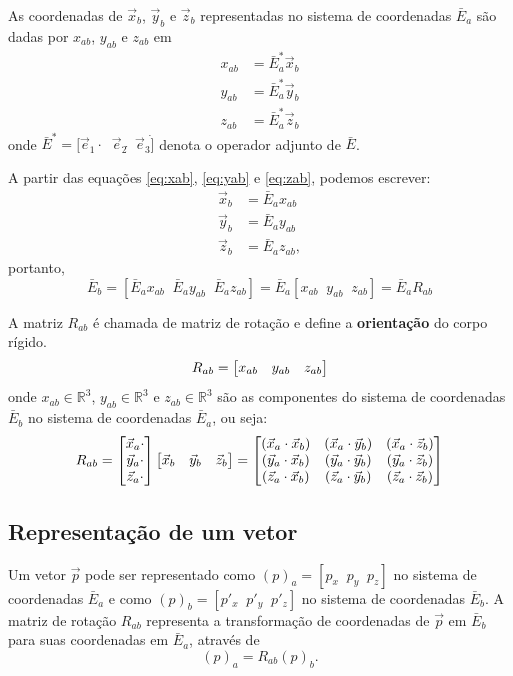As coordenadas de $\vec{x}_b$, $\vec{y}_b$ e $\vec{z}_b$ representadas no sistema de coordenadas $\bar{E}_a$ são dadas por $x_{ab}$, $y_{ab}$ e $z_{ab}$ em
\begin{align}
x_{ab} &= \bar{E}_a^* \vec{x}_b  \label{eq:xab} \\
y_{ab} &= \bar{E}_a^* \vec{y}_b \label{eq:yab}\\ 
z_{ab} &= \bar{E}_a^* \vec{z}_b \label{eq:zab}
\end{align}
onde $\bar{E}^* = [\vec{e}_1 \cdot  \;\; \vec{e}_2  \dot \;\; \vec{e}_3 \dot] $ denota o operador adjunto de $\bar{E}$.


A partir das equações \eqref{eq:xab}, \eqref{eq:yab} e \eqref{eq:zab}, podemos escrever:
\begin{align}
\vec{x}_b &= \bar{E}_a x_{ab} \\
\vec{y}_b &= \bar{E}_a y_{ab} \\
\vec{z}_b &= \bar{E}_a z_{ab} ,
\end{align}
portanto,
\begin{equation}
\bar{E}_b = [\bar{E}_a x_{ab} \;\; \bar{E}_a y_{ab} \;\; \bar{E}_a z_{ab}] = \bar{E}_a [x_{ab} \;\;  y_{ab} \;\; z_{ab}] = \bar{E}_a R_{ab}
\end{equation}

A matriz $R_{ab}$ é chamada de matriz de rotação e define a \textbf{orientação} do corpo rígido.
\begin{equation}
R_{ab} = \begin{bmatrix} x_{ab} & y_{ab} & z_{ab} \end{bmatrix}
\end{equation}
onde $x_{ab} \in \mathbb{R}^3$,  $y_{ab} \in \mathbb{R}^3$ e $z_{ab} \in \mathbb{R}^3$ são as componentes do sistema de coordenadas $\bar{E}_b$ no sistema de coordenadas $\bar{E}_a$, ou seja:
\begin{equation}
R_{ab} =  \begin{bmatrix} \vec{x}_a \cdot \\ \vec{y}_a \cdot  \\ \vec{z}_a \cdot  \end{bmatrix} \begin{bmatrix} \vec{x}_b & \vec{y}_b & \vec{z}_b \end{bmatrix} = 
\begin{bmatrix}
    (\vec{x}_a \cdot \vec{x}_b) & (\vec{x}_a \cdot \vec{y}_b)& (\vec{x}_a \cdot \vec{z}_b) \\
    (\vec{y}_a \cdot \vec{x}_b)& (\vec{y}_a \cdot \vec{y}_b)& (\vec{y}_a \cdot \vec{z}_b) \\
    (\vec{z}_a \cdot \vec{x}_b) &(\vec{z}_a \cdot \vec{y}_b)& (\vec{z}_a \cdot \vec{z}_b)
\end{bmatrix}
\end{equation}


\subsection{Representação de um vetor}
Um vetor $\vec{p}$ pode ser representado como $(p)_a = [p_{x} \;\; p_{y} \;\; p_{z}]$ no sistema de coordenadas $\bar{E}_a$ e como $(p)_b = [p'_{x} \;\; p'_{y} \;\; p'_{z}]$ no sistema de coordenadas $\bar{E}_b$. 
A matriz de rotação $R_{ab}$ representa a transformação de coordenadas de $\vec{p}$ em $\bar{E}_b$ para suas coordenadas em $\bar{E}_a$, através de 
\begin{equation}
(p)_a = R_{ab}(p)_b.
\end{equation}


